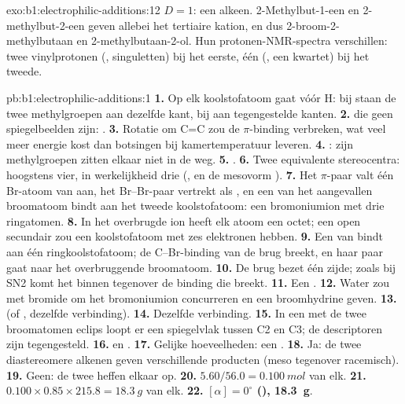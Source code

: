 \begin{solution}{exo:b1:electrophilic-additions:12}
$D = 1$: een alkeen. 2-Methylbut-1-een en 2-methylbut-2-een geven allebei
het tertiaire kation, en dus 2-broom-2-methylbutaan en
2-methylbutaan-2-ol. Hun protonen-NMR-spectra verschillen: twee
vinylprotonen (, singuletten) bij het eerste, één (,
een kwartet) bij het tweede.
\end{solution}

\begin{solution}{pb:b1:electrophilic-additions:1}
\textbf{1.} Op elk koolstofatoom gaat  vóór H: bij  staan
de twee methylgroepen aan dezelfde kant, bij  aan tegengestelde
kanten.
\textbf{2.}  die geen spiegelbeelden zijn: .
\textbf{3.} Rotatie om C=C zou de $\pi$-binding verbreken, wat veel meer
energie kost dan botsingen bij kamertemperatuur leveren.
\textbf{4.} : zijn methylgroepen zitten elkaar niet in de weg.
\textbf{5.} .
\textbf{6.} Twee equivalente stereocentra: hoogstens vier, in
werkelijkheid drie (,  en de mesovorm ).
\textbf{7.} Het $\pi$-paar valt één Br-atoom van  aan, het
Br--Br-paar vertrekt als , en een  van het aangevallen
broomatoom bindt aan het tweede koolstofatoom: een bromoniumion met drie
ringatomen.
\textbf{8.} In het overbrugde ion heeft elk atoom een octet; een open
secundair  zou een koolstofatoom met zes elektronen hebben.
\textbf{9.} Een  van  bindt aan één ringkoolstofatoom; de
C--Br-binding van de brug breekt, en haar paar gaat naar het
overbruggende broomatoom.
\textbf{10.} De brug bezet één zijde; zoals bij SN2 komt het 
binnen tegenover de binding die breekt.
\textbf{11.} Een .
\textbf{12.} Water zou met bromide om het bromoniumion concurreren en een
broomhydrine geven.
\textbf{13.}  (of , dezelfde verbinding).
\textbf{14.} Dezelfde verbinding.
\textbf{15.} In een  met de twee broomatomen eclips loopt er
een spiegelvlak tussen C2 en C3; de descriptoren zijn tegengesteld.
\textbf{16.}  en .
\textbf{17.} Gelijke hoeveelheden: een .
\textbf{18.} Ja: de twee diastereomere alkenen geven verschillende
producten (meso tegenover racemisch).
\textbf{19.} Geen: de twee  heffen elkaar op.
\textbf{20.} $5.60/56.0 = \qty{0.100}{mol}$ van elk.
\textbf{21.} $0.100 \times 0.85 \times 215.8 = \qty{18.3}{g}$ van elk.
\textbf{22.} \textbf{$[\alpha] = 0^\circ$ (), \qty{18.3}{g}}.
\end{solution}
